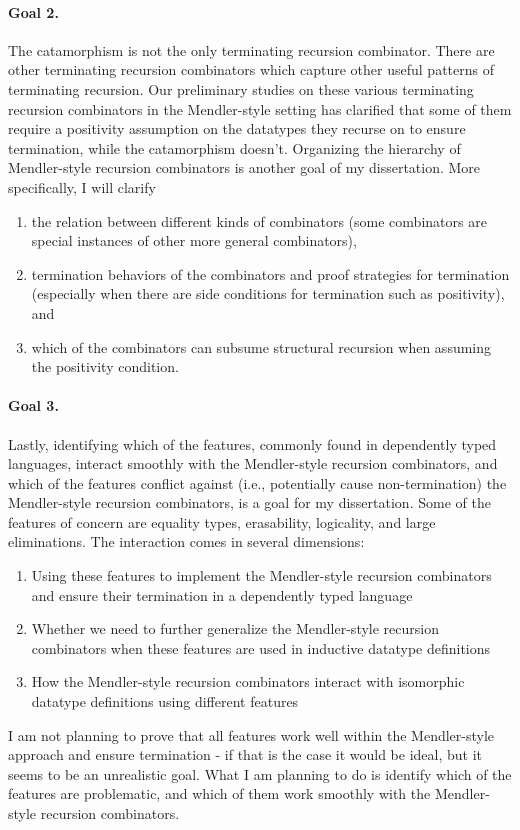 \documentclass[letterpaper,12pt]{article}
\newcommand{\ie}[0]{i.e., }
\begin{document}
\paragraph{Goal 2.}
The catamorphism is not the only terminating recursion combinator.
There are other terminating recursion combinators which capture
other useful patterns of terminating recursion.  Our preliminary studies
on these various terminating recursion combinators in the Mendler-style
setting has clarified that some of them require a positivity assumption
on the datatypes they recurse on to ensure termination,
while the catamorphism doesn't.
Organizing the hierarchy of Mendler-style recursion combinators
is another goal of my dissertation.  More specifically, I will clarify
\begin{enumerate}
 \item 
the relation between different kinds of combinators (some combinators are
special instances of other more general combinators),
 \item termination behaviors of the combinators and
       proof strategies for termination (especially when there are
       side conditions for termination such as positivity), and
 \item which of the combinators can subsume structural recursion
       when assuming the positivity condition.
\end{enumerate}

\paragraph{Goal 3.}
Lastly, identifying which of the features,
commonly found in dependently typed languages, interact smoothly with
the Mendler-style recursion combinators,
and which of the features conflict against (\ie potentially cause non-termination)
the Mendler-style recursion combinators, is a goal for my dissertation.
Some of the features of concern are equality types, erasability,
logicality, and large eliminations.
The interaction comes in several dimensions:
\begin{enumerate}
 \item Using these features to implement the Mendler-style recursion combinators
and ensure their termination in a dependently typed language
 \item Whether we need to further generalize the Mendler-style recursion combinators
when these features are used in inductive datatype definitions
 \item How the Mendler-style recursion combinators interact with
       isomorphic datatype definitions using different features
\end{enumerate}
I am not planning to prove that all features work well within
the Mendler-style approach and ensure termination - if that is the case
it would be ideal, but it seems to be an unrealistic goal.
What I am planning to do is identify which of the features are problematic,
and  which of them work smoothly  with the Mendler-style recursion combinators.
\end{document}
